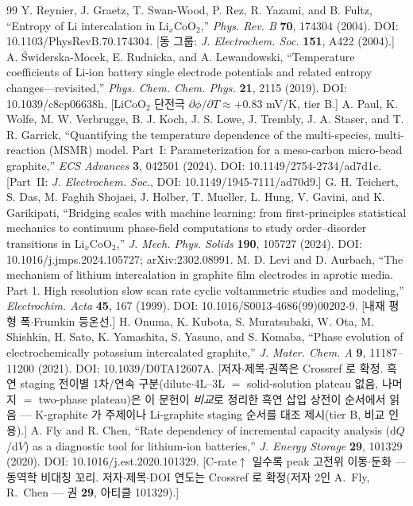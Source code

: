 \documentclass[11pt,a4paper]{article}
\begin{document}
\begin{thebibliography}{99}
 Y. Reynier, J. Graetz, T. Swan-Wood, P. Rez, R. Yazami, and B. Fultz, ``Entropy of Li intercalation in Li$_x$CoO$_2$,'' \emph{Phys. Rev. B} \textbf{70}, 174304 (2004). DOI: 10.1103/PhysRevB.70.174304. [동 그룹: \emph{J. Electrochem. Soc.} \textbf{151}, A422 (2004).]
 A. {\'S}widerska-Mocek, E. Rudnicka, and A. Lewandowski, ``Temperature coefficients of Li-ion battery single electrode potentials and related entropy changes---revisited,'' \emph{Phys. Chem. Chem. Phys.} \textbf{21}, 2115 (2019). DOI: 10.1039/c8cp06638h. [LiCoO$_2$ 단전극 $\partial\phi/\partial T\approx+0.83$ mV/K, tier B.]
 A. Paul, K. Wolfe, M. W. Verbrugge, B. J. Koch, J. S. Lowe, J. Trembly, J. A. Staser, and T. R. Garrick, ``Quantifying the temperature dependence of the multi-species, multi-reaction (MSMR) model. Part~I: Parameterization for a meso-carbon micro-bead graphite,'' \emph{ECS Advances} \textbf{3}, 042501 (2024). DOI: 10.1149/2754-2734/ad7d1c. [Part~II: \emph{J. Electrochem. Soc.}, DOI: 10.1149/1945-7111/ad70d9.]
 G. H. Teichert, S. Das, M. Faghih Shojaei, J. Holber, T. Mueller, L. Hung, V. Gavini, and K. Garikipati, ``Bridging scales with machine learning: from first-principles statistical mechanics to continuum phase-field computations to study order--disorder transitions in Li$_x$CoO$_2$,'' \emph{J. Mech. Phys. Solids} \textbf{190}, 105727 (2024). DOI: 10.1016/j.jmps.2024.105727; arXiv:2302.08991.
 M. D. Levi and D. Aurbach, ``The mechanism of lithium intercalation in graphite film electrodes in aprotic media. Part 1. High resolution slow scan rate cyclic voltammetric studies and modeling,'' \emph{Electrochim. Acta} \textbf{45}, 167 (1999). DOI: 10.1016/S0013-4686(99)00202-9. [내재 평형 폭$\cdot$Frumkin 등온선.]
 H. Onuma, K. Kubota, S. Muratsubaki, W. Ota, M. Shishkin, H. Sato, K. Yamashita, S. Yasuno, and S. Komaba, ``Phase evolution of electrochemically potassium intercalated graphite,'' \emph{J. Mater. Chem. A} \textbf{9}, 11187--11200 (2021). DOI: 10.1039/D0TA12607A. [저자$\cdot$제목$\cdot$권쪽은 Crossref 로 확정. 흑연 staging 전이별 1차/연속 구분(dilute$\cdot$4L--3L $=$ solid-solution plateau 없음, 나머지 $=$ two-phase plateau)은 이 문헌이 \emph{비교}로 정리한 흑연 삽입 상전이 순서에서 읽음 — K-graphite 가 주제이나 Li-graphite staging 순서를 대조 제시(tier B, 비교 인용).]
 A. Fly and R. Chen, ``Rate dependency of incremental capacity analysis (d$Q$/d$V$) as a diagnostic tool for lithium-ion batteries,'' \emph{J. Energy Storage} \textbf{29}, 101329 (2020). DOI: 10.1016/j.est.2020.101329. [C-rate$\uparrow$ 일수록 peak 고전위 이동$\cdot$둔화 — 동역학 비대칭 꼬리. 저자$\cdot$제목$\cdot$DOI 연도는 Crossref 로 확정(저자 2인 A.~Fly, R.~Chen — 권 \textbf{29}, 아티클 101329).]

\end{thebibliography}
\end{document}

